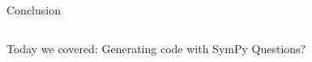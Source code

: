\begin{frame}{Conclusion}
\begin{columns}
\begin{center}
\begin{outline}
\1 Today we covered:
\2 Generating code with SymPy
\1 Questions?
\end{outline}
\end{center}

\begin{center}
\end{center}

\end{columns}
\end{frame}
